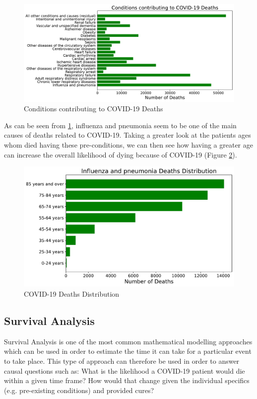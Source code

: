 \begin{figure}[ht!]%
    \centering
    \includegraphics[width=0.85\linewidth]{latex/images/deaths_conditions.pdf}
    \vspace{-0.2cm}
    \caption{Conditions contributing to COVID-19 Deaths}
    \label{d_cond}
\end{figure}

As can be seen from \ref{d_cond}, influenza and pneumonia seem to be one of the main causes of deaths related to COVID-19. Taking a greater look at the patients ages whom died having these pre-conditions, we can then see how having a greater age can increase the overall likelihood of dying because of COVID-19 (Figure \ref{d_top}).

\begin{figure}[ht!]%
    \centering
    \includegraphics[width=0.65\linewidth]{latex/images/deaths_top.pdf}
    \vspace{-0.2cm}
    \caption{COVID-19 Deaths Distribution}
    \label{d_top}
\end{figure}

\subsection{Survival Analysis}
\label{surv_app}
Survival Analysis is one of the most common mathematical modelling approaches which can be used in order to estimate the time it can take for a particular event to take place. This type of approach can therefore be used in order to answer causal questions such as: What is the likelihood a COVID-19 patient would die within a given time frame? How would that change given the individual specifics (e.g. pre-existing conditions) and provided cures?

